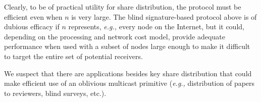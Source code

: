 Clearly, to be of practical utility for share distribution, the
protocol must be efficient even when $n$ is very large.  The blind
signature-based protocol above is of dubious efficacy if $n$
represents, {\em e.g.,} every node on the Internet, but it could,
depending on the processing and network cost model, provide adequate
performance when used with a subset of nodes large enough to make it
difficult to target the entire set of potential receivers.

We suspect that there are applications besides key share distribution
that could make efficient use of an oblivious multicast primitive
({\em e.g.,} distribution of papers to reviewers, blind surveys,
etc.).

